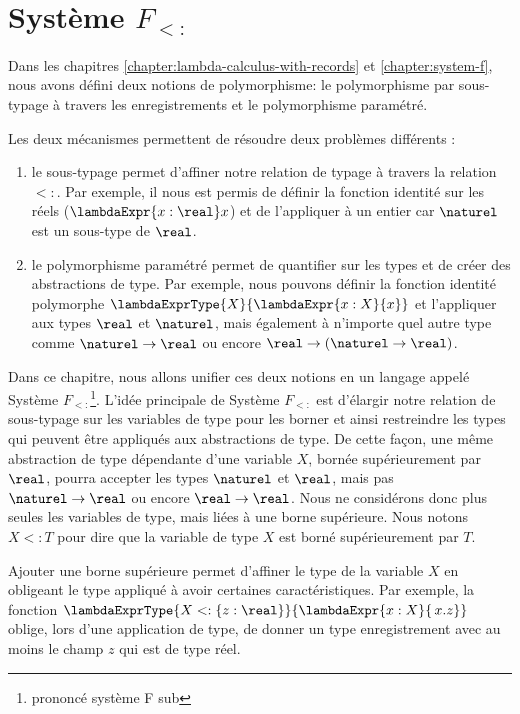\chapter{Système $F_{<:}$}
\label{chapter:system-f-sub}

Dans les chapitres \ref{chapter:lambda-calculus-with-records} et
\ref{chapter:system-f}, nous avons défini deux notions de polymorphisme: le
polymorphisme par sous-typage à travers les enregistrements et le polymorphisme
paramétré.

Les deux mécanismes permettent de résoudre deux problèmes différents :
\begin{enumerate}
  \item le sous-typage permet d'affiner notre relation de typage à travers la
    relation $<:$. Par exemple, il nous est permis de définir la fonction
    identité sur les réels ($\lambdaExpr{x : \real} x$) et de l'appliquer à un
    entier car $\naturel$ est un sous-type de $\real$.
  \item le polymorphisme paramétré permet de quantifier sur les types et de
    créer des abstractions de type. Par exemple, nous pouvons
    définir la fonction identité polymorphe $\lambdaExprType{X}{\lambdaExpr{x :
    X}{x}}$ et l'appliquer aux types $\real$ et $\naturel$, mais également à
    n'importe quel autre type comme $\naturel \rightarrow \real$ ou encore $\real
    \rightarrow (\naturel \rightarrow \real)$.
\end{enumerate}

Dans ce chapitre, nous allons unifier ces deux notions en un langage appelé
Système $F_{<:}$\footnote{prononcé \og système F sub \fg}. L'idée principale de
Système $F_{<:}$ est d'élargir notre relation de sous-typage sur les variables de
type pour les borner et ainsi restreindre les types qui peuvent être appliqués
aux abstractions de type. De cette façon, une même abstraction de type dépendante d'une
variable $X$, bornée supérieurement par $\real$, pourra accepter les types $\naturel$ et
$\real$, mais pas $\naturel \rightarrow \real$ ou encore $\real \rightarrow
\real$. Nous ne considérons donc plus seules les variables de type, mais liées
à une borne supérieure. Nous notons $X <: T$ pour dire que la variable de type
$X$ est borné supérieurement par $T$.  

Ajouter une borne supérieure permet d'affiner le type de la variable $X$ en
obligeant le type appliqué à avoir certaines caractéristiques. Par exemple, la
fonction $\lambdaExprType{X <: \left\{ z : \real \right\}}{\lambdaExpr{x :
    X}{\, x.z}}$ oblige, lors d'une application de type, de donner un type
enregistrement avec au moins le champ $z$ qui est de type réel.

